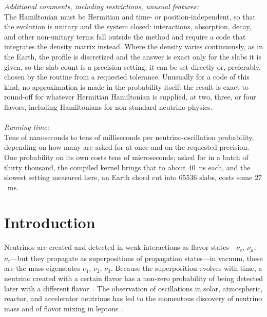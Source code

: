 \documentclass[final,5p,times,twocolumn,sort,compress]{elsarticle}
\begin{document}
\begin{small}
\smallskip
{\em Additional comments, including restrictions, unusual features:}\\
The Hamiltonian must be Hermitian and time- or position-independent, so that the evolution is unitary and the system closed: interactions, absorption, decay, and other non-unitary terms fall outside the method and require a code that integrates the density matrix instead.  Where the density varies continuously, as in the Earth, the profile is discretized and the answer is exact only for the slabs it is given, so the slab count is a precision setting; it can be set directly or, preferably, chosen by the routine from a requested tolerance.  Unusually for a code of this kind, no approximation is made in the probability itself: the result is exact to round-off for whatever Hermitian Hamiltonian is supplied, at two, three, or four flavors, including Hamiltonians for non-standard neutrino physics. \\ \\
{\em Running time:}\\
Tens of nanoseconds to tens of milliseconds per neutrino-oscillation probability, depending on how many are asked for at once and on the requested precision.  One probability on its own costs tens of microseconds; asked for in a batch of thirty thousand, the compiled kernel brings that to about $40$~ns each, and the slowest setting measured here, an Earth chord cut into $65536$ slabs, costs some $27$~ms.  

\medskip
  
\end{small}


\section{Introduction}\label{sec:introduction}

Neutrinos are created and detected in weak interactions as flavor states---$\nu_e$, $\nu_\mu$, $\nu_\tau$---but they propagate as superpositions of propagation states---in vacuum, these are the mass eigenstates $\nu_1$, $\nu_2$, $\nu_3$.  Because the superposition evolves with time, a neutrino created with a certain flavor has a non-zero probability of being detected later with a different flavor\ \cite{Pontecorvo:1967fh, Barger:1980hs, Bilenky:2004sn, Fantini:2018itu}.  The observation of oscillations in solar, atmospheric, reactor, and accelerator neutrinos has led to the momentous discovery of neutrino mass and of flavor mixing in leptons\ \cite{Kajita:2016cak, McDonald:2016ixn}.
\end{document}
